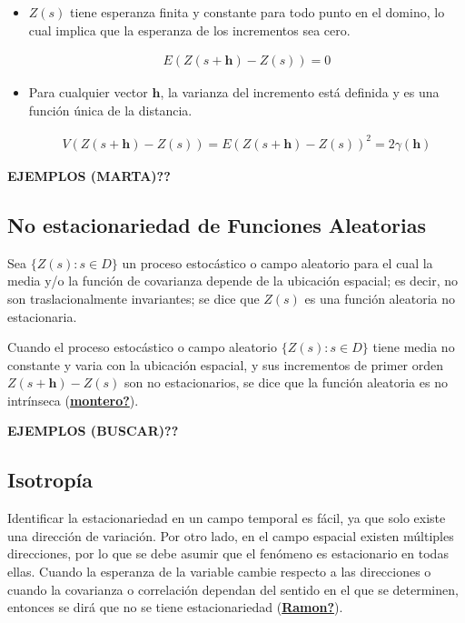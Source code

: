 \documentclass[
]{book}
\begin{document}
\begin{itemize}
\item
  \(Z(s)\) tiene esperanza finita y constante para todo punto en el domino, lo cual implica que la esperanza de los incrementos sea cero.

  \begin{align}E(Z(s+\textbf{h})-Z(s))=0\end{align}
\item
  Para cualquier vector \(\textbf{h}\), la varianza del incremento está definida y es una función única de la distancia.

  \begin{align}V(Z(s+\textbf{h})-Z(s))=E(Z(s+\textbf{h})-Z(s))^2=2\gamma(\textbf{h})\end{align}
\end{itemize}

\textbf{EJEMPLOS (MARTA)??}

\hypertarget{no-estacionariedad-de-funciones-aleatorias}{%
\subsection{No estacionariedad de Funciones Aleatorias}\label{no-estacionariedad-de-funciones-aleatorias}}

Sea \(\{Z(s): s\in D\}\) un proceso estocástico o campo aleatorio para el cual la media y/o la función de covarianza depende de la ubicación espacial; es decir, no son traslacionalmente invariantes; se dice que \(Z(s)\) es una función aleatoria no estacionaria.

Cuando el proceso estocástico o campo aleatorio \(\{Z(s): s\in D\}\) tiene media no constante y varia con la ubicación espacial, y sus incrementos de primer orden \(Z(s+\textbf{h})-Z(s)\) son no estacionarios, se dice que la función aleatoria es no intrínseca (\protect\hyperlink{ref-montero}{\textbf{montero?}}).

\textbf{EJEMPLOS (BUSCAR)??}

\hypertarget{isotropuxeda}{%
\subsection{Isotropía}\label{isotropuxeda}}

Identificar la estacionariedad en un campo temporal es fácil, ya que solo existe una dirección de variación. Por otro lado, en el campo espacial existen múltiples direcciones, por lo que se debe asumir que el fenómeno es estacionario en todas ellas. Cuando la esperanza de la variable cambie respecto a las direcciones o cuando la covarianza o correlación dependan del sentido en el que se determinen, entonces se dirá que no se tiene estacionariedad (\protect\hyperlink{ref-Ramon}{\textbf{Ramon?}}).
\end{document}
